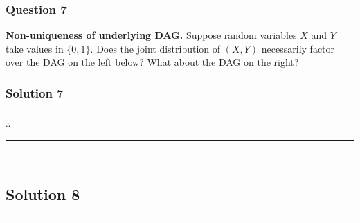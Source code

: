 \documentclass{article}
\begin{document}
\subsubsection*{Question 7}
\begin{flushleft}
    \textbf{Non-uniqueness of underlying DAG.} Suppose random variables $X$ and $Y$ take values in $\{0,1\}$. 
    Does the joint distribution of $(X, Y)$ necessarily factor over the DAG on the left below? 
    What about the DAG on the right? 

    \begin{center}
    \end{center}
\end{flushleft}

\subsubsection*{Solution 7}


\subsubsection*{\normalfont}{$\therefore$ }

\noindent\rule{\textwidth}{0.4pt}\\

\newpage

\subsection*{Solution 8}
\noindent\rule{\textwidth}{0.4pt}\\
\end{document}
